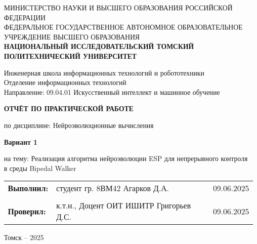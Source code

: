 \documentclass[a4paper,12pt]{article}
\begin{document}
\begin{titlepage}
	\vspace*{1cm}
	{\small
		\begin{center}
			МИНИСТЕРСТВО НАУКИ И ВЫСШЕГО ОБРАЗОВАНИЯ РОССИЙСКОЙ ФЕДЕРАЦИИ\\
			ФЕДЕРАЛЬНОЕ ГОСУДАРСТВЕННОЕ АВТОНОМНОЕ ОБРАЗОВАТЕЛЬНОЕ УЧРЕЖДЕНИЕ ВЫСШЕГО ОБРАЗОВАНИЯ\\
			\textbf{НАЦИОНАЛЬНЫЙ ИССЛЕДОВАТЕЛЬСКИЙ ТОМСКИЙ ПОЛИТЕХНИЧЕСКИЙ УНИВЕРСИТЕТ}
		\end{center}
	}
	\vspace{0.5cm}
	\begin{center}
		Инженерная школа информационных технологий и робототехники\\
		Отделение информационных технологий\\
		Направление: 09.04.01 Искусственный интеллект и машинное обучение
	\end{center}
	\vspace{1cm}
	\begin{center}
		\textbf{ОТЧЁТ ПО ПРАКТИЧЕСКОЙ РАБОТЕ}
	\end{center}
	\begin{center}
		по дисциплине: Нейроэволюционные вычисления
	\end{center}
	\vspace{0.5cm}
	\begin{center}
		\textbf{Вариант 1}
	\end{center}
	\begin{center}
		на тему: Реализация алгоритма нейроэволюции ESP для непрерывного контроля в среды Bipedal Walker
	\end{center}
	\vspace{1cm}
	
	\begin{tabular}{p{} p{} p{}}
		\textbf{Выполнил:} & студент гр. 8ВМ42 \newline Агарков Д.А.& 09.06.2025\\
		& & \\
		\textbf{Проверил:} & к.т.н., Доцент ОИТ ИШИТР \newline Григорьев Д.С. & 09.06.2025\end{tabular}
	\vfill
	\begin{center}
		Томск – 2025
	\end{center}
\end{titlepage}
\end{document}
